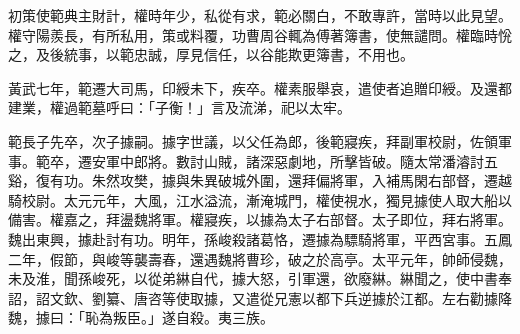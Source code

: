 \begin{pinyinscope}
 
 
 
 初策使範典主財計，權時年少，私從有求，範必關白，不敢專許，當時以此見望。權守陽羨長，有所私用，策或料覆，功曹周谷輒為傅著簿書，使無譴問。權臨時恱之，及後統事，以範忠誠，厚見信任，以谷能欺更簿書，不用也。
 
 
黃武七年，範遷大司馬，印綬未下，疾卒。權素服舉哀，遣使者追贈印綬。及還都建業，權過範墓呼曰：「子衡！」言及流涕，祀以太牢。
 
 
 
 
 範長子先卒，次子據嗣。據字世議，以父任為郎，後範寢疾，拜副軍校尉，佐領軍事。範卒，遷安軍中郎將。數討山賊，諸深惡劇地，所擊皆破。隨太常潘濬討五谿，復有功。朱然攻樊，據與朱異破城外圍，還拜偏將軍，入補馬閑右部督，遷越騎校尉。太元元年，大風，江水溢流，漸淹城門，權使視水，獨見據使人取大船以備害。權嘉之，拜盪魏將軍。權寢疾，以據為太子右部督。太子即位，拜右將軍。魏出東興，據赴討有功。明年，孫峻殺諸葛恪，遷據為驃騎將軍，平西宮事。五鳳二年，假節，與峻等襲壽春，還遇魏將曹珍，破之於高亭。太平元年，帥師侵魏，未及淮，聞孫峻死，以從弟綝自代，據大怒，引軍還，欲廢綝。綝聞之，使中書奉詔，詔文欽、劉纂、唐咨等使取據，又遣從兄憲以都下兵逆據於江都。左右勸據降魏，據曰：「恥為叛臣。」遂自殺。夷三族。
 
 
\end{pinyinscope}